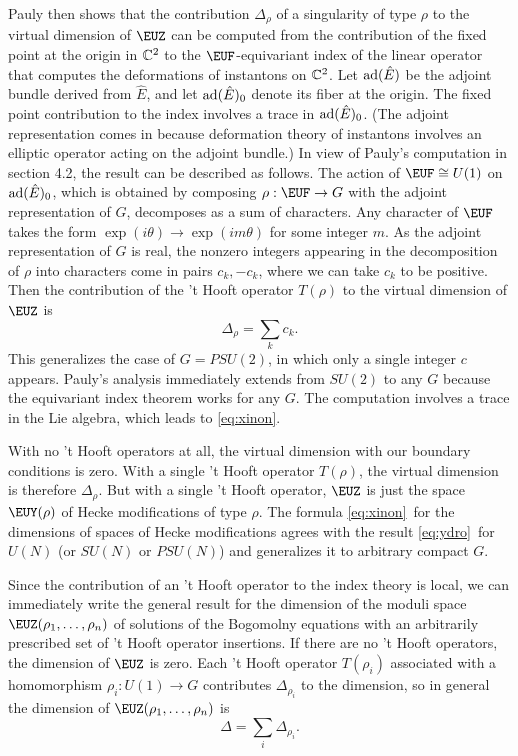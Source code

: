 Pauly then shows that the contribution $\Delta_\rho$ of a
singularity of type $\rho$ to the virtual dimension of ${\EUZ}$
can be computed from the contribution of the fixed point at the
origin in $\Bbb{C}^2$ to the ${\EUF}$-equivariant index of the
linear operator that computes the deformations of instantons on
$\Bbb{C}^2$.  Let ${\rm ad}(\hat E)$ be the adjoint bundle derived
from $\hat E$, and let ${\rm ad}(\hat E)_0$ denote its fiber at
the origin. The fixed point contribution to the index involves a
trace in ${\rm ad}(\hat E)_0$. (The adjoint representation comes
in because deformation theory of instantons involves an elliptic
operator acting on the adjoint bundle.)  In view of Pauly's
computation in section 4.2, the result can be described as
follows. The action of ${\EUF}\cong U(1)$ on ${\rm ad}(\hat E)_0$,
which is obtained by composing $\rho:{\EUF}\to G$ with the adjoint
representation of $G$, decomposes as a sum of characters. Any
character of ${\EUF}$ takes the form $\exp(i\theta)\to
\exp(im\theta)$ for some integer $m$. As the adjoint
representation of $G$ is real, the nonzero integers appearing in
the decomposition of $\rho$ into characters come in pairs
$c_k,-c_k$, where we can take $c_k$ to be positive.
  Then the contribution of the
't Hooft operator $T(\rho)$ to the virtual dimension of $\EUZ$ is
\setcounter{equation}{3}
\begin{equation}\label{eq:xinon}
\Delta_\rho=\sum_kc_k.
\end{equation}
 This generalizes the case of
$G=PSU(2)$, in which only a single integer $c$ appears.  Pauly's
analysis immediately extends from $SU(2)$ to any $G$ because the
equivariant index theorem works for any $G$. The computation
involves a trace in the Lie algebra, which leads to \eqref{eq:xinon}.

With no 't Hooft operators at all, the virtual dimension with our
boundary conditions is zero. With a single 't Hooft operator
$T(\rho)$, the virtual dimension is therefore $\Delta_\rho$. But
with a single 't Hooft operator,  $\EUZ$ is just the space
${{\EUY}}(\rho)$ of Hecke modifications of type $\rho$. The
formula \eqref{eq:xinon}\ for the dimensions of spaces of Hecke
modifications agrees with the result \eqref{eq:ydro}\ for $U(N)$ (or $SU(N)$
or $PSU(N)$) and generalizes it to arbitrary compact $G$.

Since the contribution of an 't Hooft operator to the index theory
is local, we can immediately write the general result for the
dimension of the moduli space ${\EUZ}(\rho_1,\dots,\rho_n)$ of
solutions of the Bogomolny equations with an arbitrarily
prescribed set of 't Hooft operator insertions. If there are no 't
Hooft operators, the dimension of ${\EUZ}$ is zero. Each 't Hooft
operator $T(\rho_i)$ associated with a homomorphism
$\rho_i:U(1)\to G$ contributes $\Delta_{\rho_i}$ to the dimension,
so in general the dimension of ${\EUZ}(\rho_1,\dots,\rho_n)$ is
\setcounter{equation}{4}
\begin{equation}\label{eq:migoty}
\Delta=\sum_i\Delta_{\rho_i}.
\end{equation}
